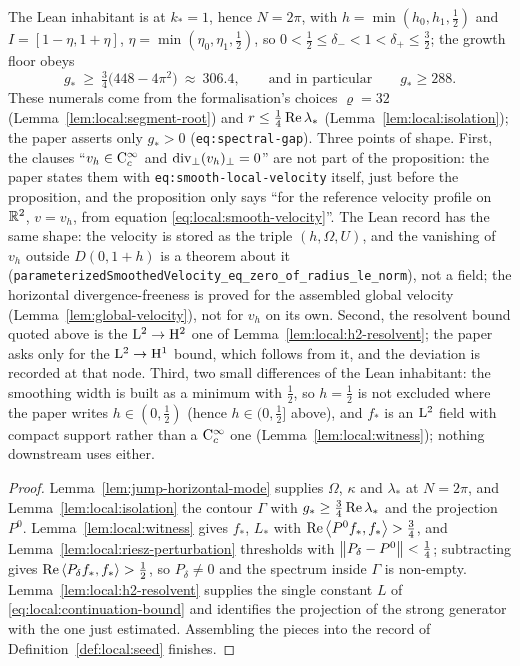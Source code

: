 The Lean inhabitant is at $k_*=1$, hence $N=2\pi$, with $h=\min(h_0,h_1,\tfrac12)$ and
$I=[1-\eta,1+\eta]$, $\eta=\min(\eta_0,\eta_1,\tfrac12)$, so
$0<\tfrac12\leq\delta_-<1<\delta_+\leq\tfrac32$; the growth floor obeys
\[
  g_*\ \geq\ \tfrac34\bigl(448-4\pi^2\bigr)\ \approx\ 306.4,
  \qquad\text{and in particular}\qquad g_*\geq288 .
\]
These numerals come from the formalisation's choices $\varrho=32$
(Lemma~\ref{lem:local:segment-root}) and $r\leq\tfrac14\operatorname{Re}\lambda_*$
(Lemma~\ref{lem:local:isolation}); the paper asserts only $g_*>0$
(\texttt{eq:spectral-gap}).  Three points of shape.  First, the clauses
``$v_h\in\mathrm{C}_c^\infty$ and $\operatorname{div}_\perp(v_h)_\perp=0$'' are not part of the proposition: the
paper states them with \texttt{eq:smooth-local-velocity} itself, just before the
proposition, and the proposition only says ``for the reference velocity profile on $\mathbb{R}^2$,
$v=v_h$, from equation \eqref{eq:local:smooth-velocity}''.  The Lean record has the same shape: the velocity
is stored as the triple $(h,\Omega,U)$, and the vanishing of $v_h$ outside $D(0,1+h)$ is a
theorem about it (\texttt{parameterizedSmoothedVelocity\_eq\_zero\_of\_radius\_le\_norm}),
not a field; the horizontal divergence-freeness is proved for the assembled global velocity
(Lemma~\ref{lem:global-velocity}), not for $v_h$ on its own.  Second,
the resolvent bound quoted above is the $\mathrm{L}^2\to\mathrm{H}^2$ one of
Lemma~\ref{lem:local:h2-resolvent}; the paper asks only for the $\mathrm{L}^2\to\mathrm{H}^1$ bound,
which follows from it, and the deviation is recorded at that node.  Third, two small
differences of the Lean inhabitant: the smoothing width is built as a minimum with
$\tfrac12$, so $h=\tfrac12$ is not excluded where the paper writes
$h\in(0,\tfrac12)$ (hence $h\in(0,\tfrac12]$ above), and $f_*$ is an $\mathrm{L}^2$ field with compact support rather than a
$\mathrm{C}_c^\infty$ one (Lemma~\ref{lem:local:witness}); nothing downstream uses either.

\begin{proof}
  \leanok
  Lemma~\ref{lem:jump-horizontal-mode} supplies $\Omega$, $\kappa$ and $\lambda_*$ at
  $N=2\pi$, and Lemma~\ref{lem:local:isolation} the contour $\Gamma$ with
  $g_*\geq\tfrac34\operatorname{Re}\lambda_*$ and the projection $P^0$.
  Lemma~\ref{lem:local:witness} gives $f_*$, $L_*$ with $\operatorname{Re}\left\langle P^0f_*,f_*\right\rangle>\tfrac34$,
  and Lemma~\ref{lem:local:riesz-perturbation} thresholds with
  $\left\|P_\delta-P^0\right\|<\tfrac14$; subtracting gives
  $\operatorname{Re}\left\langle P_\delta f_*,f_*\right\rangle>\tfrac12$, so $P_\delta\neq0$ and the spectrum inside
  $\Gamma$ is non-empty.  Lemma~\ref{lem:local:h2-resolvent} supplies the single constant
  $L$ of \eqref{eq:local:continuation-bound} and identifies the projection of the strong
  generator with the one just estimated.  Assembling the pieces into the record of
  Definition~\ref{def:local:seed} finishes.
\end{proof}
